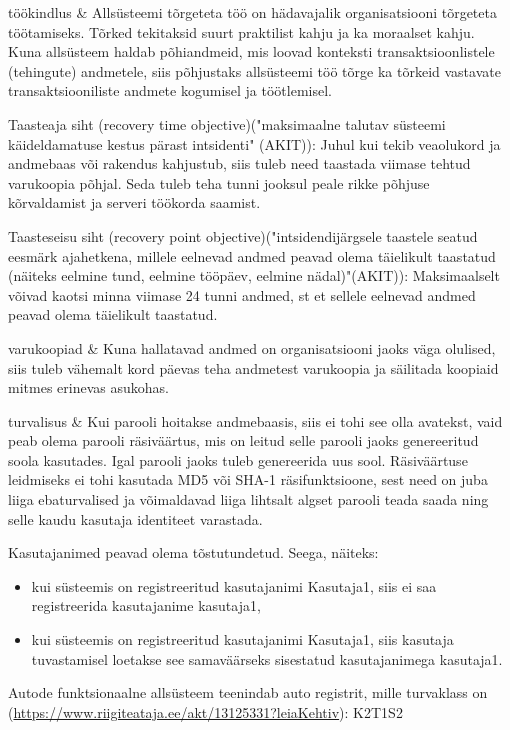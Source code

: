 \begin{longtabu}
	töökindlus 
	& Allsüsteemi tõrgeteta töö on hädavajalik organisatsiooni tõrgeteta töötamiseks. Tõrked tekitaksid suurt praktilist kahju ja ka moraalset kahju. Kuna allsüsteem haldab põhiandmeid, mis loovad konteksti transaktsioonlistele (tehingute) andmetele, siis põhjustaks allsüsteemi töö tõrge ka tõrkeid vastavate transaktsiooniliste andmete kogumisel ja töötlemisel. \linebreak \par
	Taasteaja siht (recovery time objective)("maksimaalne talutav süsteemi käideldamatuse kestus pärast intsidenti" (AKIT)): Juhul kui tekib veaolukord ja andmebaas või rakendus kahjustub, siis tuleb need taastada viimase tehtud varukoopia põhjal. Seda tuleb teha tunni jooksul peale rikke põhjuse kõrvaldamist ja serveri töökorda saamist. \linebreak \par
	Taasteseisu siht (recovery point objective)("intsidendijärgsele taastele seatud eesmärk ajahetkena, millele eelnevad andmed peavad olema täielikult taastatud (näiteks eelmine tund, eelmine tööpäev, eelmine nädal)"(AKIT)): Maksimaalselt võivad kaotsi minna viimase 24 tunni andmed, st et sellele eelnevad andmed peavad olema täielikult taastatud.	  \\ \hline
	
	
	varukoopiad 
	& Kuna hallatavad andmed on organisatsiooni jaoks väga olulised, siis tuleb vähemalt kord päevas teha andmetest varukoopia ja säilitada koopiaid mitmes erinevas asukohas.
	  \\ \hline
	
	turvalisus 
	& Kui parooli hoitakse andmebaasis, siis ei tohi see olla avatekst, vaid peab olema parooli räsiväärtus, mis on leitud selle parooli jaoks genereeritud soola kasutades. Igal parooli jaoks tuleb genereerida uus sool. Räsiväärtuse leidmiseks ei tohi kasutada MD5 või SHA-1 räsifunktsioone, sest need on juba liiga ebaturvalised ja võimaldavad liiga lihtsalt algset parooli teada saada ning selle kaudu kasutaja identiteet varastada. \linebreak \par
	Kasutajanimed peavad olema tõstutundetud. Seega, näiteks:
	\begin{itemize}
		\item kui süsteemis on registreeritud kasutajanimi Kasutaja1, siis ei saa registreerida kasutajanime kasutaja1,
		\item kui süsteemis on registreeritud kasutajanimi Kasutaja1, siis kasutaja tuvastamisel loetakse see samaväärseks sisestatud kasutajanimega kasutaja1.
	\end{itemize}
	Autode funktsionaalne allsüsteem teenindab auto registrit, mille turvaklass on (\url{https://www.riigiteataja.ee/akt/13125331?leiaKehtiv}): \linebreak
	K2T1S2 \linebreak \par
	

\end{longtabu}
